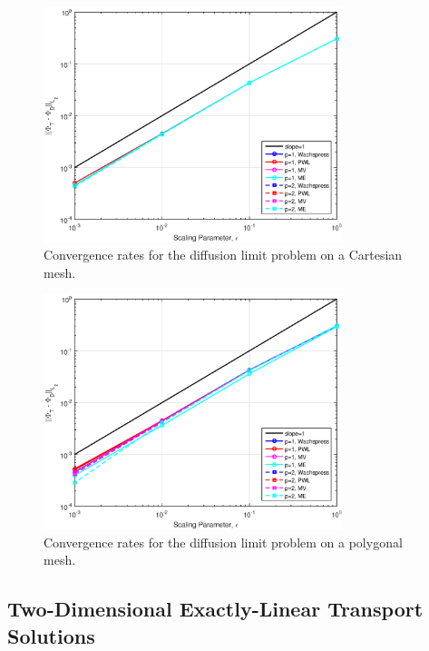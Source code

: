 \begin{figure}
\centering
\includegraphics[width=0.775\textwidth]{figures/sec_BF/DLConvergenceError_Cartesian.eps}
\caption{Convergence rates for the diffusion limit problem on a Cartesian mesh.}
\label{fig::BF_Results_DL_Conv_Cart}
\end{figure}

\begin{figure}
\centering
\includegraphics[width=0.775\textwidth]{figures/sec_BF/DLConvergenceError_SqPoly.eps}
\caption{Convergence rates for the diffusion limit problem on a polygonal mesh.}
\label{fig::BF_Results_DL_Conv_Poly}
\end{figure}

\subsection{Two-Dimensional Exactly-Linear Transport Solutions}
\label{sec::BF_Results_Linear}


